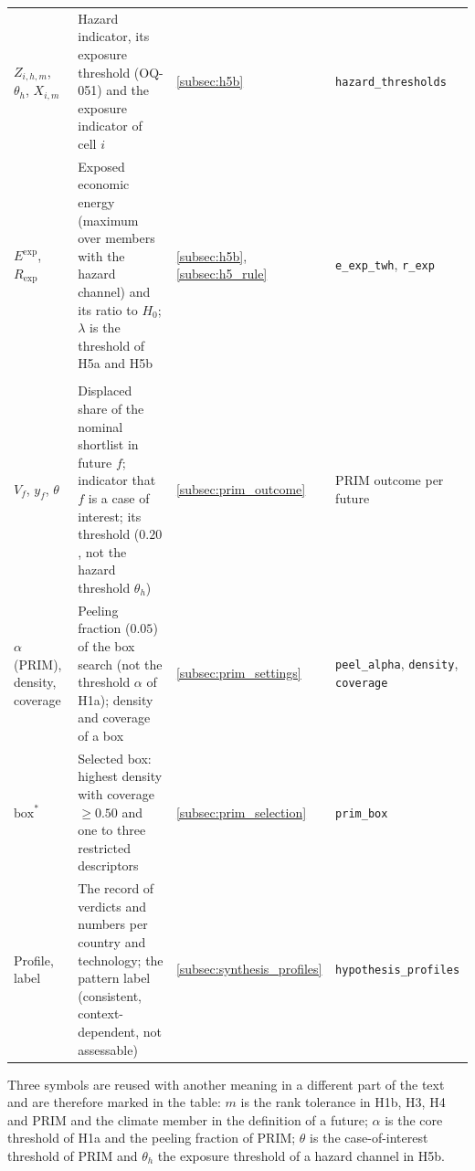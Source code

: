 \begin{longtable}{@{}p{}p{}p{}p{}@{}}
$Z_{i,h,m}$, $\theta_h$, $X_{i,m}$ & Hazard indicator, its exposure threshold (OQ-051) and the exposure indicator of cell $i$ & \ref{subsec:h5b} & \texttt{hazard\_thresholds} \\
$E^{\mathrm{exp}}$, $R_{\mathrm{exp}}$ & Exposed economic energy (maximum over members with the hazard channel) and its ratio to $H_0$; $\lambda$ is the threshold of H5a and H5b & \ref{subsec:h5b}, \ref{subsec:h5_rule} & \texttt{e\_exp\_twh}, \texttt{r\_exp} \\
\addlinespace
\multicolumn{4}{@{}l}{\textit{Synthesis and PRIM}}\\
$V_f$, $y_f$, $\theta$ & Displaced share of the nominal shortlist in future $f$; indicator that $f$ is a case of interest; its threshold ($0.20$, not the hazard threshold $\theta_h$) & \ref{subsec:prim_outcome} & PRIM outcome per future \\
$\alpha$ (PRIM), density, coverage & Peeling fraction ($0.05$) of the box search (not the threshold $\alpha$ of H1a); density and coverage of a box & \ref{subsec:prim_settings} & \texttt{peel\_alpha}, \texttt{density}, \texttt{coverage} \\
$\mathrm{box}^{*}$ & Selected box: highest density with coverage $\geq0.50$ and one to three restricted descriptors & \ref{subsec:prim_selection} & \texttt{prim\_box} \\
Profile, label & The record of verdicts and numbers per country and technology; the pattern label (consistent, context-dependent, not assessable) & \ref{subsec:synthesis_profiles} & \texttt{hypothesis\_profiles} \\
\end{longtable}

Three symbols are reused with another meaning in a different part of the text and
are therefore marked in the table: $m$ is the rank tolerance in H1b, H3, H4 and
PRIM and the climate member in the definition of a future; $\alpha$ is the core
threshold of H1a and the peeling fraction of PRIM; $\theta$ is the case-of-interest
threshold of PRIM and $\theta_h$ the exposure threshold of a hazard channel in H5b.
